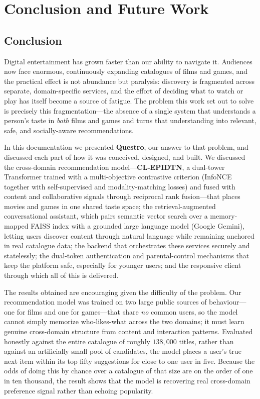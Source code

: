 \chapter{Conclusion and Future Work}

\section{Conclusion}
Digital entertainment has grown faster than our ability to navigate it. Audiences now face enormous, continuously expanding catalogues of films and games, and the practical effect is not abundance but paralysis: discovery is fragmented across separate, domain-specific services, and the effort of deciding what to watch or play has itself become a source of fatigue. The problem this work set out to solve is precisely this fragmentation---the absence of a single system that understands a person's taste in \emph{both} films and games and turns that understanding into relevant, safe, and socially-aware recommendations.

In this documentation we presented \textbf{Questro}, our answer to that problem, and discussed each part of how it was conceived, designed, and built. We discussed the cross-domain recommendation model---\textbf{CL-EPIDTN}, a dual-tower Transformer trained with a multi-objective contrastive criterion (InfoNCE together with self-supervised and modality-matching losses) and fused with content and collaborative signals through reciprocal rank fusion---that places movies and games in one shared taste space; the retrieval-augmented conversational assistant, which pairs semantic vector search over a memory-mapped FAISS index with a grounded large language model (Google Gemini), letting users discover content through natural language while remaining anchored in real catalogue data; the backend that orchestrates these services securely and statelessly; the dual-token authentication and parental-control mechanisms that keep the platform safe, especially for younger users; and the responsive client through which all of this is delivered.

The results obtained are encouraging given the difficulty of the problem. Our recommendation model was trained on two large public sources of behaviour---one for films and one for games---that share \emph{no} common users, so the model cannot simply memorize who-likes-what across the two domains; it must learn genuine cross-domain structure from content and interaction patterns. Evaluated honestly against the entire catalogue of roughly $138{,}000$ titles, rather than against an artificially small pool of candidates, the model places a user's true next item within its top fifty suggestions for close to one user in five. Because the odds of doing this by chance over a catalogue of that size are on the order of one in ten thousand, the result shows that the model is recovering real cross-domain preference signal rather than echoing popularity.

